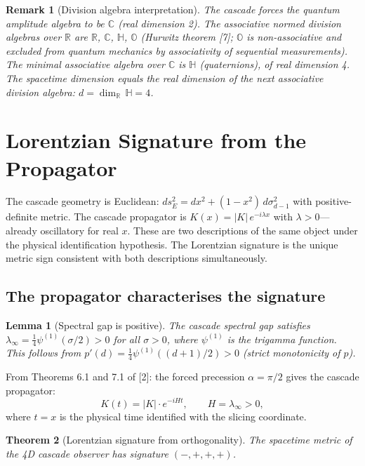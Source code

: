 \documentclass[12pt,a4paper]{article}
\newtheorem{theorem}{Theorem}[section]
\newtheorem{lemma}[theorem]{Lemma}
\newtheorem*{remark}{Remark}
\begin{document}
\begin{remark}[Division algebra interpretation]
The cascade forces the quantum amplitude
algebra to be $\mathbb{C}$ (real dimension 2). The associative normed division algebras over $\mathbb{R}$ are $\mathbb{R}$,
$\mathbb{C}$, $\mathbb{H}$, $\mathbb{O}$ (Hurwitz theorem [7]; $\mathbb{O}$ is non-associative and excluded from quantum mechanics
by associativity of sequential measurements). The minimal associative algebra over $\mathbb{C}$ is $\mathbb{H}$
(quaternions), of real dimension 4. The spacetime dimension equals the real dimension of
the next associative division algebra: $d = \dim_\mathbb{R}\,\mathbb{H} = 4$.
\end{remark}

\section{Lorentzian Signature from the Propagator}

The cascade geometry is Euclidean: $ds^2_E = dx^2 + (1 - x^2)\,d\sigma_{d-1}^2$ with positive-definite
metric. The cascade propagator is $K(x) = |K|\,e^{-i\lambda x}$ with $\lambda > 0$---already oscillatory for
real $x$. These are two descriptions of the same object under the physical identification
hypothesis. The Lorentzian signature is the unique metric sign consistent with both
descriptions simultaneously.

\subsection{The propagator characterises the signature}

\begin{lemma}[Spectral gap is positive]
The cascade spectral gap satisfies $\lambda_\infty =
\tfrac{1}{4}\psi^{(1)}(\sigma/2) > 0$ for all $\sigma > 0$, where $\psi^{(1)}$ is the trigamma function. This follows from $p'(d) =
\tfrac{1}{4}\psi^{(1)}((d + 1)/2) > 0$ (strict monotonicity of $p$).
\end{lemma}

From Theorems 6.1 and 7.1 of [2]: the forced precession $\alpha = \pi/2$ gives the cascade
propagator:
\[
K(t) = |K| \cdot e^{-iHt}, \qquad H = \lambda_\infty > 0,
\]
where $t = x$ is the physical time identified with the slicing coordinate.

\begin{theorem}[Lorentzian signature from orthogonality]
The spacetime metric of the
4D cascade observer has signature $(-,+,+,+)$.
\end{theorem}
\end{document}
